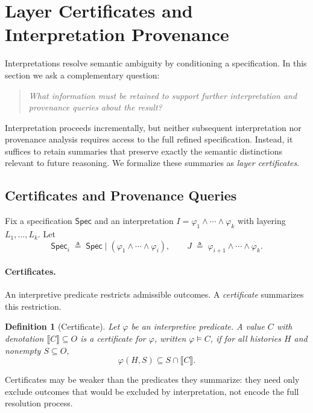 \documentclass[acmsmall,nonacm]{acmart}
\newtheorem{definition}{Definition}
\theoremstyle{remark}
\numberwithin{definition}{section}
\numberwithin{theorem}{section}
\numberwithin{lemma}{section}
\numberwithin{corollary}{section}
\numberwithin{remark}{section}
\numberwithin{example}{section}
\numberwithin{observation}{section}
\numberwithin{assumption}{section}
\newcommand{\Spec}{\mathsf{Spec}}
\begin{document}
\section{Layer Certificates and Interpretation Provenance}
\label{sec:certificates}

Interpretations resolve semantic ambiguity by conditioning a specification.
In this section we ask a complementary question:

\begin{quote}
\emph{What information must be retained to support further interpretation
\emph{and} provenance queries about the result?}
\end{quote}

Interpretation proceeds incrementally, but neither subsequent interpretation nor
provenance analysis requires access to the full refined specification.
Instead, it suffices to retain summaries that preserve exactly the semantic
distinctions relevant to future reasoning.
We formalize these summaries as \emph{layer certificates}.

\subsection{Certificates and Provenance Queries}

Fix a specification $\Spec$ and an interpretation
$I = \varphi_1 \wedge \cdots \wedge \varphi_k$ with layering
$L_1,\ldots,L_k$.
Let
\[
  \Spec_i \;\triangleq\; \Spec \mid (\varphi_1 \wedge \cdots \wedge \varphi_i),
  \qquad
  J \;\triangleq\; \varphi_{i+1} \wedge \cdots \wedge \varphi_k .
\]

\paragraph{Certificates.}
An interpretive predicate restricts admissible outcomes.
A \emph{certificate} summarizes this restriction.

\begin{definition}[Certificate]
Let $\varphi$ be an interpretive predicate.
A value $C$ with denotation $\llbracket C \rrbracket \subseteq O$ is a
\emph{certificate} for $\varphi$, written $\varphi \models C$, if for all histories
$H$ and nonempty $S \subseteq O$,
\[
  \varphi(H,S) \subseteq S \cap \llbracket C \rrbracket .
\]
\end{definition}

Certificates may be weaker than the predicates they summarize: they need only
exclude outcomes that would be excluded by interpretation, not encode the full
resolution process.
\end{document}
